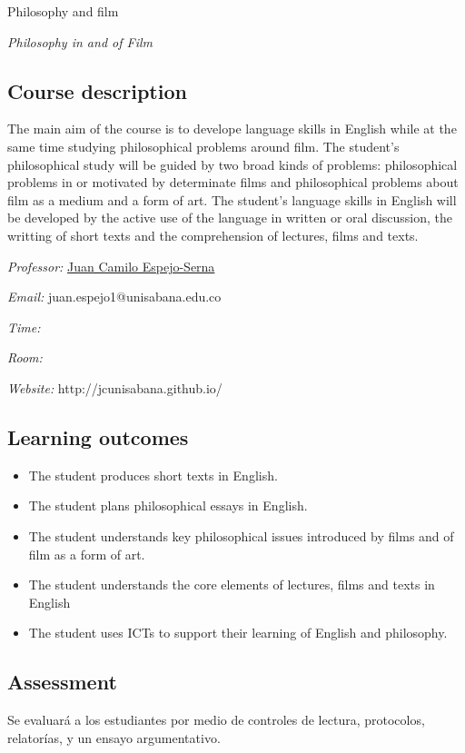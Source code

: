 \documentclass[]{article}
\begin{document}
{ \huge Philosophy and film}

{ \large \emph{Philosophy in and of Film}}

\subsection{Course description}\label{descripciuxf3n-del-seminario}

The main aim of the course is to develope language skills in English while at the same time studying philosophical problems around film. The student's philosophical study will be guided by two broad kinds of problems: philosophical problems in or motivated by determinate films and philosophical problems about film as a medium and a form of art. The student's language skills in English will be developed by the active use of the language in written or oral discussion, the writting of short texts and the comprehension of lectures, films and texts.


\emph{Professor:} \href{http://jcunisabana.github.io/}{Juan Camilo Espejo-Serna}

\emph{Email:} juan.espejo1@unisabana.edu.co

\emph{Time:} 

\emph{Room:} 

\emph{Website:} http://jcunisabana.github.io/

\subsection{Learning outcomes}
\begin{itemize}
\item
  The student produces short texts in English.
  \item
    The student plans philosophical essays in English.
\item
  The student understands key philosophical issues introduced by films and of film as a form of art.
\item
  The student understands the core elements of lectures, films and texts in English
\item
 The student uses ICTs to support their learning of English and philosophy.
\end{itemize}

\subsection{Assessment}
Se evaluará a los estudiantes por medio de controles de lectura,
protocolos, relatorías, y un ensayo argumentativo.
\end{document}
